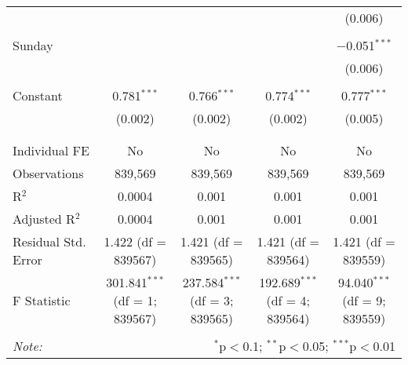 \documentclass[
]{article}
\begin{document}
\begin{table}[!htbp]
{\begin{tabular}{@{\extracolsep{5pt}}lcccc}
  &  &  &  & (0.006) \\ 
  & & & & \\ 
 Sunday &  &  &  & $-$0.051$^{***}$ \\ 
  &  &  &  & (0.006) \\ 
  & & & & \\ 
 Constant & 0.781$^{***}$ & 0.766$^{***}$ & 0.774$^{***}$ & 0.777$^{***}$ \\ 
  & (0.002) & (0.002) & (0.002) & (0.005) \\ 
  & & & & \\ 
\hline \\[-1.8ex] 
Individual FE & No & No & No & No \\ 
Observations & 839,569 & 839,569 & 839,569 & 839,569 \\ 
R$^{2}$ & 0.0004 & 0.001 & 0.001 & 0.001 \\ 
Adjusted R$^{2}$ & 0.0004 & 0.001 & 0.001 & 0.001 \\ 
Residual Std. Error & 1.422 (df = 839567) & 1.421 (df = 839565) & 1.421 (df = 839564) & 1.421 (df = 839559) \\ 
F Statistic & 301.841$^{***}$ (df = 1; 839567) & 237.584$^{***}$ (df = 3; 839565) & 192.689$^{***}$ (df = 4; 839564) & 94.040$^{***}$ (df = 9; 839559) \\ 
\hline 
\hline \\[-1.8ex] 
\textit{Note:}  & \multicolumn{4}{r}{$^{*}$p$<$0.1; $^{**}$p$<$0.05; $^{***}$p$<$0.01} \\ 
\end{tabular}
} 
\end{table} 
\newpage
\end{document}
